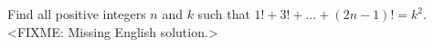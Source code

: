 \problem
Find all positive integers $n$ and $k$ such that
$1! + 3! + \ldots + (2 n - 1)! = k^2$.  
\solution
<FIXME: Missing English solution.>
\endproblem
